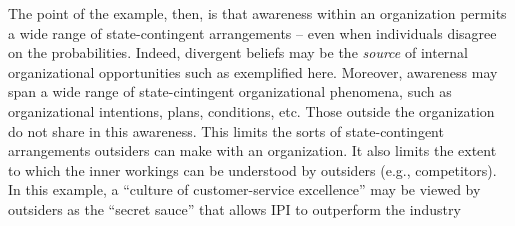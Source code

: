 \documentclass[
11pt,
titlepage,
reqno,
]{article}%
\theoremstyle{definition}
\begin{document}
The point of the example, then, is that awareness within an organization permits a wide range of state-contingent arrangements -- even when individuals disagree on the probabilities.
Indeed, divergent beliefs may be the \textit{source} of internal organizational opportunities such as exemplified here. 
Moreover, awareness may span a wide range of state-cintingent organizational phenomena, such as organizational intentions, plans, conditions, etc.
Those outside the organization do not share in this awareness. 
This limits the sorts of state-contingent arrangements outsiders can make with an organization.  
It also limits the extent to which the inner workings can be understood by outsiders (e.g., competitors).
In this example, a ``culture of customer-service excellence'' may be viewed by outsiders as the ``secret sauce'' that allows IPI to outperform the industry
\end{document}
